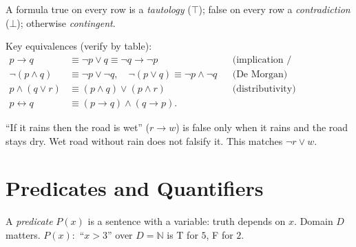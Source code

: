 \begin{definition}
A formula true on every row is a \emph{tautology} ($\top$); false on every row a \emph{contradiction} ($\bot$); otherwise \emph{contingent}.
\end{definition}

Key equivalences (verify by table):
\begin{align*}
p\to q &\equiv \neg p\lor q \equiv \neg q\to\neg p &&\text{(implication / contrapositive)}\\
\neg(p\land q) &\equiv \neg p\lor\neg q,\quad \neg(p\lor q)\equiv\neg p\land\neg q &&\text{(De Morgan)}\\
p\land(q\lor r) &\equiv(p\land q)\lor(p\land r) &&\text{(distributivity)}\\
p\leftrightarrow q &\equiv(p\to q)\land(q\to p). &&
\end{align*}

\begin{example}
``If it rains then the road is wet'' ($r\to w$) is false only when it rains and the road stays dry. Wet road without rain does not falsify it. This matches $\neg r\lor w$.
\end{example}

\section{Predicates and Quantifiers}
\label{sec:predicates}
A \emph{predicate} $P(x)$ is a sentence with a variable: truth depends on $x$. Domain $D$ matters. $P(x):$ ``$x>3$'' over $D=\mathbb{N}$ is T for $5$, F for $2$.

